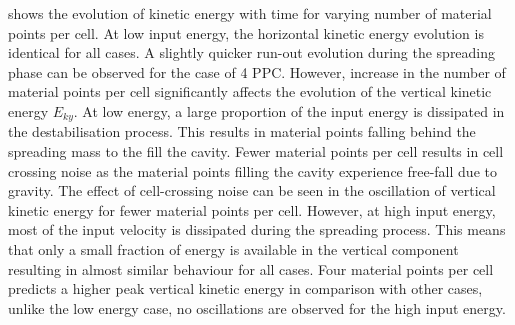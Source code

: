 shows the evolution of kinetic energy with time for varying 
number of material points per cell. At low input energy, the horizontal kinetic 
energy evolution is identical for all cases. A slightly quicker run-out 
evolution during the spreading phase can be observed for the case of 4 PPC.  
However, increase in the number of material points per cell significantly 
affects the evolution of the vertical kinetic energy $E_{ky}$. At low energy, a 
large proportion of the input energy is dissipated in the destabilisation 
process. This results in material points falling behind the spreading mass to 
the fill the cavity. Fewer material points per cell results in cell 
crossing noise as the material points filling the cavity experience free-fall 
due to gravity. The effect of cell-crossing noise can be seen in the 
oscillation of vertical kinetic energy for fewer material points per cell. 
However, at high input energy, most of the input velocity is dissipated during 
the spreading process. This means that only a small fraction of energy is 
available in the vertical component resulting in almost similar behaviour for 
all cases. Four material points per cell predicts a higher peak vertical 
kinetic energy in comparison with other cases, unlike the low energy case, no 
oscillations are observed for the high input energy.

